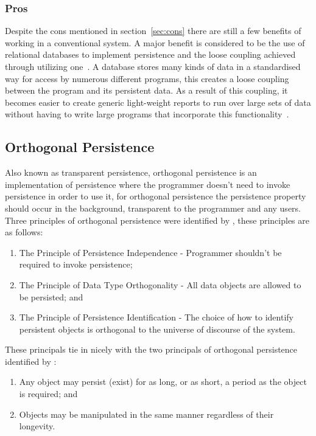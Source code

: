 \documentclass[a4paper,12pt]{article}
\begin{document}
\subsubsection{Pros}
Despite the cons mentioned in section~\ref{sec:cons} there are still a few benefits of working in a conventional system. A major benefit is considered to be the use of relational databases to implement persistence and the loose coupling achieved through utilizing one~\citep{Databases}.
A database stores many kinds of data in a standardised way for access by numerous different programs, this creates a loose coupling between the program and its persistent data. As a result of this coupling, it becomes easier to create generic light-weight reports to run over large sets of data without having to write large programs that incorporate this functionality~\citep{XML}.
\subsection{Orthogonal Persistence}\label{sec:orthogonal}
Also known as transparent persistence, orthogonal persistence is an implementation of persistence where the programmer doesn't need to invoke persistence in order to use it, for orthogonal persistence the persistence property should occur in the background, transparent to the programmer and any users.
Three principles of orthogonal persistence were identified by \citet{Atkinson}, these principles are as follows:
\begin{enumerate}
    \item{The Principle of Persistence Independence - Programmer shouldn't be required to invoke persistence;}
    \item{The Principle of Data Type Orthogonality - All data objects are allowed to be persisted; and}
    \item{The Principle of Persistence Identification - The choice of how to identify persistent objects is orthogonal to the universe of discourse of the system.}
\end{enumerate}
These principals tie in nicely with the two principals of orthogonal persistence identified by \citet{Grasshopper}:
\begin{enumerate}
    \item{Any object may persist (exist) for as long, or as short, a period as the object is required; and}
    \item{Objects may be manipulated in the same manner regardless of their longevity.}
\end{enumerate}
\end{document}
